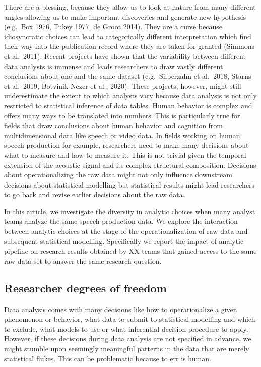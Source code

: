 \documentclass[
  english,
  man]{apa6}
\begin{document}
There are a blessing, because they allow us to look at nature from many different angles allowing us to make important discoveries and generate new hypothesis (e.g.~Box 1976, Tukey 1977, de Groot 2014).
They are a curse because idiosyncratic choices can lead to categorically different interpretation which find their way into the publication record where they are taken for granted (Simmons et al.~2011).
Recent projects have shown that the variability between different data analysts is immense and leads researchers to draw vastly different conclusions about one and the same dataset (e.g.~Silberzahn et al.~2018, Starns et al.~2019, Botvinik-Nezer et al., 2020).
These projects, however, might still underestimate the extent to which analysts vary because data analysis is not only restricted to statistical inference of data tables.
Human behavior is complex and offers many ways to be translated into numbers.
This is particularly true for fields that draw conclusions about human behavior and cognition from multidimensional data like speech or video data.
In fields working on human speech production for example, researchers need to make many decisions about what to measure and how to measure it.
This is not trivial given the temporal extension of the acoustic signal and its complex structural composition.
Decisions about operationalizing the raw data might not only influence downstream decisions about statistical modelling but statistical results might lead researchers to go back and revise earlier decisions about the raw data.

In this article, we investigate the diversity in analytic choices when many analyst teams analyze the same speech production data.
We explore the interaction between analytic choices at the stage of the operationalization of raw data and subsequent statistical modelling.
Specifically we report the impact of analytic pipeline on research results obtained by XX teams that gained access to the same raw data set to answer the same research question.

\hypertarget{researcher-degrees-of-freedom}{%
\subsection{Researcher degrees of freedom}\label{researcher-degrees-of-freedom}}

Data analysis comes with many decisions like how to operationalize a given phenomenon or behavior, what data to submit to statistical modelling and which to exclude, what models to use or what inferential decision procedure to apply.
However, if these decisions during data analysis are not specified in advance, we might stumble upon seemingly meaningful patterns in the data that are merely statistical flukes.
This can be problematic because to err is human.
\end{document}
